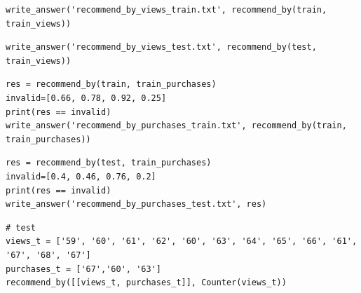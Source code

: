 \documentclass[11pt,a4paper]{article}
\begin{document}
\begin{verbatim}
write_answer('recommend_by_views_train.txt', recommend_by(train, train_views))
\end{verbatim}

\begin{verbatim}
write_answer('recommend_by_views_test.txt', recommend_by(test, train_views))
\end{verbatim}

\begin{verbatim}
res = recommend_by(train, train_purchases)    
invalid=[0.66, 0.78, 0.92, 0.25]
print(res == invalid)
write_answer('recommend_by_purchases_train.txt', recommend_by(train, train_purchases))
\end{verbatim}

\begin{verbatim}
res = recommend_by(test, train_purchases)    
invalid=[0.4, 0.46, 0.76, 0.2]
print(res == invalid)
write_answer('recommend_by_purchases_test.txt', res)
\end{verbatim}

\begin{verbatim}
# test
views_t = ['59', '60', '61', '62', '60', '63', '64', '65', '66', '61', '67', '68', '67']
purchases_t = ['67','60', '63']
recommend_by([[views_t, purchases_t]], Counter(views_t))
\end{verbatim}
\end{document}
